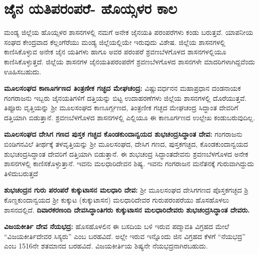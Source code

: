 \section*{ಜೈನ ಯತಿಪರಂಪರೆ- ಹೊಯ್ಸಳರ ಕಾಲ}

ಮಂಡ್ಯ ಜಿಲ್ಲೆಯ ಹೊಯ್ಸಳರ ಶಾಸನಗಳಲ್ಲಿ ನಮಗೆ ಅನೇಕ ಜೈನಯತಿ ಪರಂಪರೆಗಳು ಕಂಡು ಬರುತ್ತವೆ. ಯಾಪನೀಯ ಸಂಘದ ಕೇಂದ್ರವಾದ ಕೆಲ್ಲಂಗೆರೆಯು ಮಂಡ್ಯ ಜಿಲ್ಲೆಯಲ್ಲಿಯೇ ಇರುವುದು ವಿಶೇಷ. ಜಿಲ್ಲೆಯ ಶಾಸನಗಳಲ್ಲಿ ಕಾಣಿಸಿಕೊಳ್ಳುವ ಅನೇಕ ಜೈನ ಯತಿಗಳು ಹಾಗೂ ಅವರ ಪರಂಪರೆ ಶ್ರವಣಬೆಳಗೊಳದ ಶಾಸನಗಳಲ್ಲಿಯೂ ಕಾಣಿಸಿಕೊಳ್ಳುತ್ತದೆ. ಜಿಲ್ಲೆಯ ಶಾಸನಗಳ ಜೈನಯತಿಪರಂಪರೆಗೆ ಶ್ರವಣಬೆಳಗೊಳದ ಶಾಸನಗಳೇ ಮಾದರಿಗಳಾಗಿದ್ದವೆಂದು ಊಹಿಸಬಹುದು.

\textbf{ಮೂಲಸಂಘದ ಕಾಣೂರ್ಗಣದ ತಿಂತ್ರಣೀಕ ಗಚ್ಛದ ಮೇಘಚಂದ್ರ:} ವಿಷ್ಣುವರ್ಧನನ ಮಹಾಪ್ರಧಾನ ದಂಡನಾಯಕ ಗಂಗರಾಜನು ಇಬ್ಬರು ಜೈನಯತಿಗಳಿಗೆ ದತ್ತಿಯನ್ನು ಬಿಟ್ಟ ಉದಾಹರಣೆಗಳು ಜಿಲ್ಲೆಯ ಶಾಸನಗಳಲ್ಲಿ ದೊರೆಯುತ್ತವೆ. ತಿಪ್ಪೂರು ವೃತ್ತಿಯನ್ನು ಶ‍್ರೀ ಮೂಲಸಂಘದ ಕಾಣೂರ್ಗ್ಗಣದ, ತಿಂತ್ರಣೀಕ ಗಚ್ಛದ ಮೇಘಚಂದ್ರ ಸಿದ್ಧಾಂತ ದೇವರಿಗೆ ದತ್ತಿಯಾಗಿ ಬಿಡುತ್ತಾನೆ. ಶ್ರವಣಬೆಳಗೊಳದ ಶಾಸನಗಳಲ್ಲಿ ಎಲ್ಲಿಯೂ ಈ ಕಾಣೂರ್ಗಣದ ಉಲ್ಲೇಖ ಕಂಡುಬರುವುದಿಲ್ಲ.

\newpage

\textbf{ಮೂಲಸಂಘದ ದೇಸಿಗ ಗಣದ ಪುಸ್ತಕ ಗಚ್ಛದ ಕೊಂಡಕುಂದಾನ್ವಯದ ಶುಭಚಂದ್ರಸಿದ್ಧಾಂತ ದೇವ:} ಗಂಗರಾಜನು ಬಿಂಡಿಗನವಿಲೆ ತೀರ್ಥಕ್ಕೆ ತಳವೃತ್ತಿಯನ್ನು ಶ‍್ರೀ ಮೂಲಸಂಘದ, ದೇಸಿಗ ಗಣದ, ಪುಸ್ತಕಗಚ್ಛದ, ಕೊಂಡಕುಂದಾನ್ವಯದ ಶುಭಚಂದ್ರಸಿದ್ಧಾಂತ ದೇವರಿಗೆ ದತ್ತಿಯಾಗಿ ಬಿಡುತ್ತಾನೆ. ಈ ಶುಭಚಂದ್ರ ಸಿದ್ಧಾಂತದೇವನು ಶ್ರವಣಬೆಳಗೊಳದ ಅನೇಕ ಶಾಸನಗಳಲ್ಲಿ ಕಾಣಿಸಕೊಳ್ಳುತ್ತಾನೆ. ಇವನು ಮಲಧಾರಿದೇವನ ಶಿಷ್ಯ. ಇವನು ಗಂಗರಾಜನ ಮನೆತನಕ್ಕೆ ಗುರುವಾಗಿದ್ದುದು ತಿಳಿದುಬರುತ್ತದೆ

\textbf{ಶುಭಚಂದ್ರನ ಗುರು ಪರಂಪರೆ \general{\enginline{-}} ಕುಕ್ಕುಟಾಸನ ಮಲಧಾರಿ ದೇವ:} ಶ‍್ರೀ ಮೂಲಸಂಘದ ದೇಸಿಗಗಣದ ಪೊಸ್ತಕಗಚ್ಛದ ಶ್ರಿ ಕೊಣ್ಡಕುಂದಾನ್ವಯದ ಶ‍್ರೀ ಕುಕ್ಕುಟ (ಕುಕ್ಕುಟಾಸನ) ಮಲಧಾರಿದೇವರ ಗುರುಪರಂಪರೆಯು ಹೊಸಹೊಳಲು ಶಾಸನ\-ದಲ್ಲಿದೆ.\textbf{ ದಿವಾರಕರಣಂದಿ ದೇವಸಿದ್ಧಾಂತಿಗರು \general{\enginline{-}} ಕುಕ್ಕುಟಾಸನ ಮಲಧಾರಿದೇವರು \general{\enginline{-}} ಶುಭಚಂದ್ರಸಿದ್ಧಾಂತ ದೇವರು.}

\textbf{ವಿಜಯಕೀರ್ತಿ ದೇವ\general{\enginline{-}} ನೆಯಭದ್ರ:} ಹೊಸಹೊಳಲಿನ ಈ ಬಸದಿಯ ಬಳಿ ಇರುವ ಪದ್ಮಾವತಿ ವಿಗ್ರಹದ ಮೇಲೆ “ವಿಜಯಕೀರ್ತಿದೇವರ ಸಿಸ್ಯರು” ಎಂಬ ಬರಹವಿದೆ. ಅಲ್ಲೇ ಇರುವ ಇನ್ನೊಂದು ಜಿನ ವಿಗ್ರಹದ ಕೆಳಗೆ “ನೆಯಭದ್ರ” ಎಂಬ 15\enginline{-}16ನೇ ಶತಮಾನದ ಬರಹವಿದೆ. ವಿಜಯಕೀರ್ತಿಯ ಶಿಷ್ಯನೇ ನೆಯಭದ್ರನಾಗಿರಬಹುದು.

